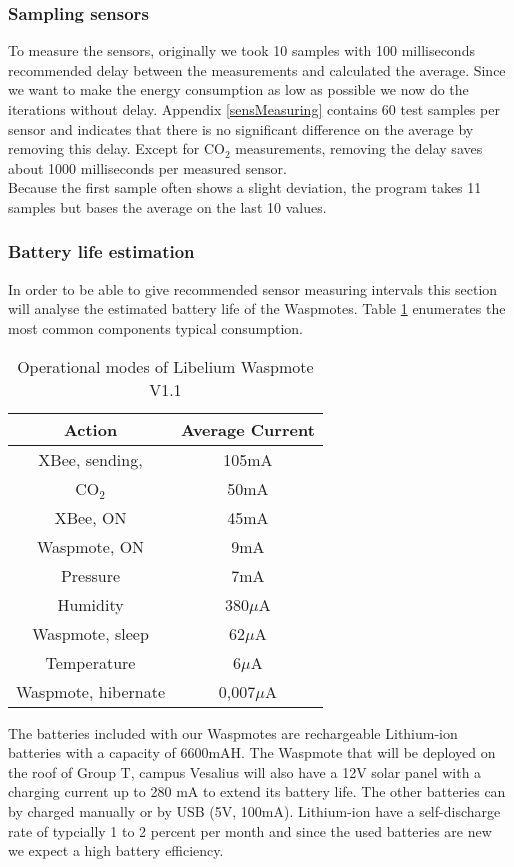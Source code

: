 \subsubsection{Sampling sensors}
To measure the sensors, originally we took 10 samples with 100 milliseconds recommended delay between the measurements and calculated the average. Since we want to make the energy consumption as low as possible we now do the iterations without delay. Appendix \ref{sensMeasuring} contains 60 test samples per sensor and indicates that there is no significant difference on the average by removing this delay. Except for CO$_{2}$ measurements, removing the delay saves about 1000 milliseconds per measured sensor.\\ 
Because the first sample often shows a slight deviation, the program takes 11 samples but bases the average on the last 10 values.
\subsubsection{Battery life estimation}
In order to be able to give recommended sensor measuring intervals this section will analyse the estimated battery life of the Waspmotes. Table \ref{tab:cons2} enumerates the most common components typical consumption.
\begin{table}[!ht]
\begin{center}
\begin{tabular}[!ht]{|c|c|}
\hline
\textbf{Action} & \textbf{Average Current}\\
\hline
XBee, sending, & 105mA\\
\hline
CO$_{2}$ & 50mA\\
\hline
XBee, ON & 45mA\\
\hline
Waspmote, ON & 9mA\\
\hline
Pressure & 7mA\\
\hline
Humidity & 380$\mu$A\\
\hline
Waspmote, sleep & 62$\mu$A\\
\hline
Temperature & 6$\mu$A\\
\hline
Waspmote, hibernate & 0,007$\mu$A\\
\hline
\end{tabular}
\caption{Operational modes of Libelium Waspmote V1.1}
\label{tab:cons2}
\end{center}
\end{table}
The batteries included with our Waspmotes are rechargeable Lithium-ion batteries with a capacity of 6600mAH. The Waspmote that will be deployed on the roof of Group T, campus Vesalius will also have a 12V solar panel with a charging current up to 280 mA to extend its battery life. The other batteries can by charged manually or by USB (5V, 100mA). Lithium-ion have a self-discharge rate of typcially 1 to 2 percent per month \citep{LION} and since the used batteries are new we expect a high battery efficiency.\\
